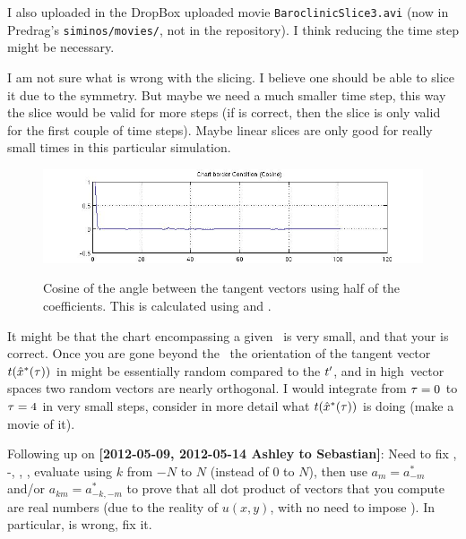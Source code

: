 \begin{description}
I also uploaded in the DropBox uploaded movie
\texttt{BaroclinicSlice3.avi} (now in Predrag's \texttt{siminos/movies/},
not in the repository). I think reducing the
time step might be necessary.

I am not sure what is
wrong with the slicing. I believe one should be able to slice it due to
the symmetry. But maybe we need a much smaller time step, this way the
slice would be valid for more steps (if  is correct,
then the slice is only valid for the first couple of time steps). Maybe
linear slices are only good for really small times in this particular
simulation.

\begin{figure}
  \includegraphics[width=1\textwidth]{ChartBorder}\\
  \caption{Cosine of the angle between the tangent vectors using half of
  the coefficients. This is calculated using  and
  .
  }\label{ChartBorder}
\end{figure}

\item[2012-05-13  Predrag]
It might be that the chart encompassing a given \template\ is very small,
and that your  is correct. Once you are gone beyond
the \ChartBord\ the orientation of the tangent vector
$t(\hat{x}^\ast(\tau))$ in  might be
essentially random compared to the $t'_{}$, and in high\dmn\ vector
spaces two random vectors are nearly orthogonal. I would integrate from
$\tau=0$ to $\tau=4$ in very small steps, consider in more detail what
$t(\hat{x}^\ast(\tau))$ is doing (make a movie of it).


\item[2012-06-13 Sebastian and Predrag] Following up on {\bf [2012-05-09,
2012-05-14 Ashley to Sebastian]}: Need to fix
, -,
, , evaluate using $k$ from $-N$ to $N$
(instead of $0$ to $N$), then use $a_m=a^*_{-m}$ and/or
$a_{km}=a^*_{-k,-m}$ to prove that all dot product of vectors that you
compute are real numbers (due to the reality of $u(x,y)$, with no need to
impose ). In particular,  is
wrong, fix it.


\end{description}
